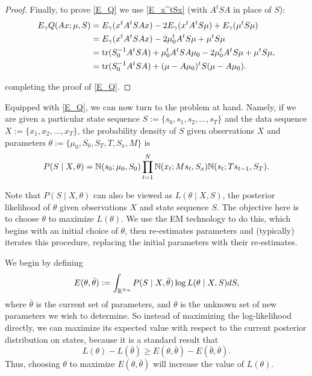 \documentclass[12pt,leqno]{article}
\begin{document}
\begin{proof}
    Finally, to prove \eqref{E_Q} we  use \eqref{E_x^tSx} (with $A^tSA$ in place of $S$):
      \begin{align*}
        E_{\gamma}Q(Ax;\mu,S) &= E_{\gamma}(x^tA^tSAx) - 2E_{\gamma}(x^tA^tS\mu) + E_{\gamma}(\mu^tS\mu) \\
        &= E_{\gamma}(x^tA^tSAx) - 2\mu_0^tA^tS\mu + \mu^tS\mu\\
        &= \tr(S_0^{-1}A^tSA) + \mu_0^tA^tSA\mu_0 - 2\mu_0^tA^tS\mu + \mu^tS\mu,\\
        &= \tr(S_0^{-1}A^tSA) + (\mu-A\mu_0)^tS(\mu- A\mu_0). %
      \end{align*}

completing the proof of \eqref{E_Q}.
  \end{proof}
  
Equipped with \eqref{E_Q}, we can now turn to the problem at hand.  Namely, if we are given a particular
state sequence $S := \{s_0,s_1,s_2,\dots,s_T\}$ and the data sequence $X := \{x_1,x_2,\dots,x_T\}$,
the probability density of $S$ given observations $X$ and  parameters $\theta := \{\mu_0,S_0,S_T,T,S_x,M\}$ is
\begin{equation} \label{density}
P(S\mid X,\theta) = {\mathbb N}(s_0;\mu_0,S_0)\prod_{t=1}^N{\mathbb N}(x_t;Ms_t,S_x){\mathbb N}(s_t;Ts_{t-1},S_T).
\end{equation}

Note that $P(S\mid X, \theta)$ can also be viewed as  $L(\theta\mid X,S)$, the posterior likelihood of $\theta$
given observations $X$ and state sequence $S$.  The objective here is to choose $\theta$ to maximize $L(\theta)$.
We use the EM technology to do this, which begins with an initial choice of $\theta$, then re-estimates
parameters and (typically) iterates this procedure, replacing the initial parameters with their re-estimates.

We begin by defining 
$$
E(\theta,\bar{\theta}) := \int_{{\mathbb R}^{Nn}}P(S\mid X,\bar{\theta})\log{L(\theta\mid X,S)}dS,
$$
where $\bar{\theta}$ is the current set of parameters, and $\theta$ is the unknown set of new parameters
we wish to determine. So instead of maximizing the log-likelihood directly, we can maximize its expected
value with respect to the current posterior distribution on states, because it is a standard result \cite{Dempster}
that
$$
L(\theta) - L(\bar{\theta}) \ge E(\theta,\bar{\theta}) - E(\bar{\theta},\bar{\theta}).
$$
Thus, choosing $\theta$ to maximize $E(\theta,\bar{\theta})$ will increase the value of $L(\theta)$.
\end{document}
